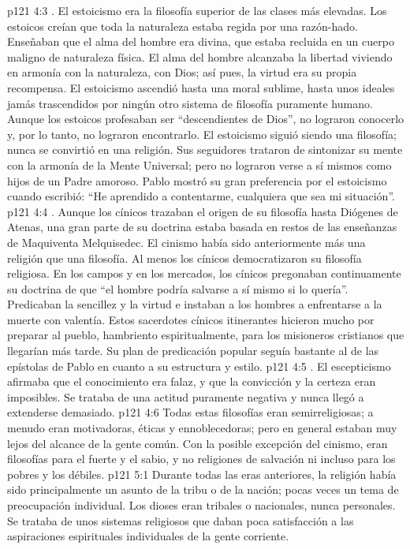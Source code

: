 \vs p121 4:3 . El estoicismo era la filosofía superior de las clases más elevadas. Los estoicos creían que toda la naturaleza estaba regida por una razón\hyp{}hado. Enseñaban que el alma del hombre era divina, que estaba recluida en un cuerpo maligno de naturaleza física. El alma del hombre alcanzaba la libertad viviendo en armonía con la naturaleza, con Dios; así pues, la virtud era su propia recompensa. El estoicismo ascendió hasta una moral sublime, hasta unos ideales jamás trascendidos por ningún otro sistema de filosofía puramente humano. Aunque los estoicos profesaban ser “descendientes de Dios”, no lograron conocerlo y, por lo tanto, no lograron encontrarlo. El estoicismo siguió siendo una filosofía; nunca se convirtió en una religión. Sus seguidores trataron de sintonizar su mente con la armonía de la Mente Universal; pero no lograron verse a sí mismos como hijos de un Padre amoroso. Pablo mostró su gran preferencia por el estoicismo cuando escribió: “He aprendido a contentarme, cualquiera que sea mi situación”.
\vs p121 4:4 . Aunque los cínicos trazaban el origen de su filosofía hasta Diógenes de Atenas, una gran parte de su doctrina estaba basada en restos de las enseñanzas de Maquiventa Melquisedec. El cinismo había sido anteriormente más una religión que una filosofía. Al menos los cínicos democratizaron su filosofía religiosa. En los campos y en los mercados, los cínicos pregonaban continuamente su doctrina de que “el hombre podría salvarse a sí mismo si lo quería”. Predicaban la sencillez y la virtud e instaban a los hombres a enfrentarse a la muerte con valentía. Estos sacerdotes cínicos itinerantes hicieron mucho por preparar al pueblo, hambriento espiritualmente, para los misioneros cristianos que llegarían más tarde. Su plan de predicación popular seguía bastante al de las epístolas de Pablo en cuanto a su estructura y estilo.
\vs p121 4:5 . El escepticismo afirmaba que el conocimiento era falaz, y que la convicción y la certeza eran imposibles. Se trataba de una actitud puramente negativa y nunca llegó a extenderse demasiado.
\vs p121 4:6 \pc Todas estas filosofías eran semirreligiosas; a menudo eran motivadoras, éticas y ennoblecedoras; pero en general estaban muy lejos del alcance de la gente común. Con la posible excepción del cinismo, eran filosofías para el fuerte y el sabio, y no religiones de salvación ni incluso para los pobres y los débiles.
\vs p121 5:1 Durante todas las eras anteriores, la religión había sido principalmente un asunto de la tribu o de la nación; pocas veces un tema de preocupación individual. Los dioses eran tribales o nacionales, nunca personales. Se trataba de unos sistemas religiosos que daban poca satisfacción a las aspiraciones espirituales individuales de la gente corriente.
